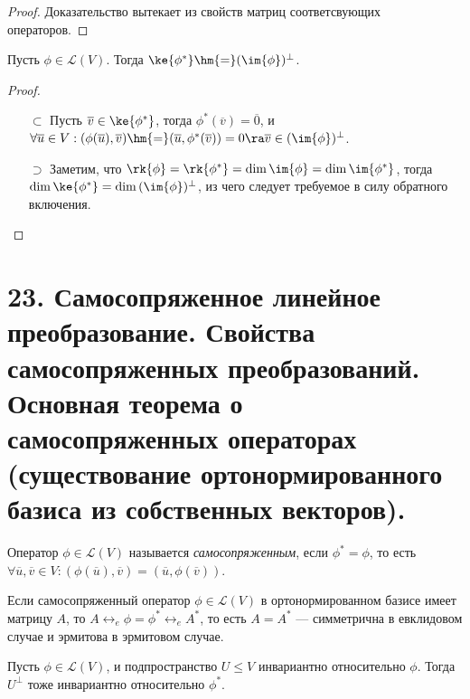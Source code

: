 \begin{proof}
    Доказательство вытекает из свойств матриц соответсвующих операторов.
\end{proof}

\begin{theorem}[Фредгольма]
    Пусть $\phi \in \mathcal{L}(V)$. Тогда $\ke{\phi^*} \hm{=} (\im{\phi})^\perp$.
\end{theorem}

\begin{proof}~
    \begin{itemize}
        \item[$\subset$] Пусть $\overline{v} \in \ke{\phi^*}$, тогда $\phi^*(\overline{v}) = \overline{0}$, и $\forall \overline{u} \in V: (\phi(\overline{u}), \overline{v}) \hm{=} (\overline{u}, \phi^*(\overline{v})) = 0 \ra \overline{v} \in (\im{\phi})^\perp$.
        
        \item[$\supset$] Заметим, что $\rk{\phi} = \rk{\phi^*} = \dim{\im{\phi}} = \dim{\im{\phi^*}}$, тогда $\dim{\ke{\phi^*}} = \dim{(\im{\phi})^\perp}$, из чего следует требуемое в силу обратного включения.\qedhere
    \end{itemize}
\end{proof}

\section{23. Самосопряженное линейное преобразование. Свойства самосопряженных преобразований. Основная теорема о самосопряженных операторах (существование ортонормированного базиса из собственных векторов).}

\begin{definition}
    Оператор $\phi \in \mathcal{L}(V)$ называется \textit{самосопряженным}, если $\phi^* = \phi$, то есть $\forall \overline{u}, \overline{v} \in V: (\phi(\overline{u}), \overline{v}) = (\overline{u}, \phi(\overline{v}))$.
\end{definition}

\begin{note}
    Если самосопряженный оператор $\phi \in \mathcal{L}(V)$ в ортонормированном базисе имеет матрицу $A$, то $A \leftrightarrow_e \phi = \phi^* \leftrightarrow_e A^*$, то есть $A = A^*$ --- симметрична в евклидовом случае и эрмитова в эрмитовом случае.
\end{note}

\begin{proposition}
    Пусть $\phi \in \mathcal{L}(V)$, и подпространство $U \le V$ инвариантно относительно $\phi$. Тогда $U^\perp$ тоже инвариантно относительно $\phi^*$.
\end{proposition}

